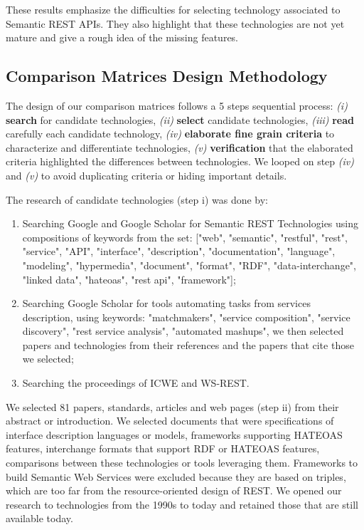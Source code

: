 These results emphasize the difficulties for selecting technology associated to Semantic REST APIs. They also highlight that these technologies are not yet mature and give a rough idea of the missing features.

\subsection{Comparison Matrices Design Methodology}

The design of our comparison matrices follows a 5 steps sequential process: \textit{(i)} \textbf{search} for candidate technologies, \textit{(ii)} \textbf{select} candidate technologies, \textit{(iii)} \textbf{read} carefully each candidate technology, \textit{(iv)} \textbf{elaborate fine grain criteria} to characterize and differentiate technologies, \textit{(v)} \textbf{verification} that the elaborated criteria highlighted the differences between technologies. We looped on step \textit{(iv)} and \textit{(v)} to avoid duplicating criteria or hiding important details.

The research of candidate technologies (step i) was done by:

\begin{enumerate}
    \item Searching Google and Google Scholar for Semantic REST Technologies using compositions of keywords from the set: ["web", "semantic", "restful", "rest", "service", "API", "interface", "description", "documentation", "language", "modeling", "hypermedia", "document", "format", "RDF", "data-interchange", "linked data", "hateoas", "rest api", "framework"];
    \item Searching Google Scholar for tools automating tasks from services description, using keywords: "matchmakers", "service composition", "service discovery", "rest service analysis", "automated mashups", we then selected papers and technologies from their references and the papers that cite those we selected;
    \item Searching the proceedings of ICWE and WS-REST. 
\end{enumerate}

We selected 81 papers, standards, articles and web pages (step ii) from their abstract or introduction. We selected documents that were specifications of interface description languages or models, frameworks supporting HATEOAS features, interchange formats that support RDF or HATEOAS features, comparisons between these technologies or tools leveraging them. Frameworks to build Semantic Web Services were excluded because they are based on triples, which are too far from the resource-oriented design of REST. We opened our research to technologies from the 1990s to today and retained those that are still available today.

